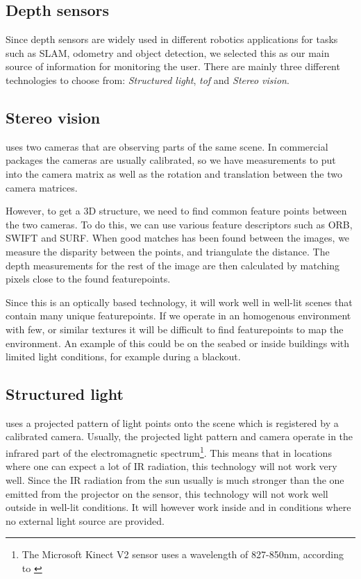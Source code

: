 
\begin{appendices}
  
\section{Depth sensors}

Since depth sensors are widely used in different robotics applications for tasks such as SLAM, odometry and object detection, we selected this as our main source of information for monitoring the user. There are mainly three different technologies to choose from: \emph{Structured light}, \emph{\gls{tof}} and \emph{Stereo vision}. 

\subsection{Stereo vision} uses two cameras that are observing parts of the same scene. In commercial packages the cameras are usually calibrated, so we have measurements to put into the camera matrix as well as the rotation and translation between the two camera matrices.

However, to get a 3D structure, we need to find common feature points between the two cameras. To do this, we can use various feature descriptors such as ORB, SWIFT and SURF. When good matches has been found between the images, we measure the disparity between the points, and triangulate the distance. The depth measurements for the rest of the image are then calculated by matching pixels close to the found featurepoints.

Since this is an optically based technology, it will work well in well-lit scenes that contain many unique featurepoints. If we operate in an homogenous environment with few, or similar textures it will be difficult to find featurepoints to map the environment. An example of this could be on the seabed or inside buildings with limited light conditions, for example during a blackout.

\subsection{Structured light} uses a projected pattern of light points onto the scene which is registered by a calibrated camera. Usually, the projected light pattern and camera operate in the infrared part of the electromagnetic spectrum\footnote{The Microsoft Kinect V2 sensor uses a wavelength of 827-850nm, according to \cite[Chapter~4.1]{survey3dcameras}}. This means that in locations where one can expect a lot of IR radiation, this technology will not work very well. Since the IR radiation from the sun usually is much stronger than the one emitted from the projector on the sensor, this technology will not work well outside in well-lit conditions. It will however work inside and in conditions where no external light source are provided.


\end{appendices}
